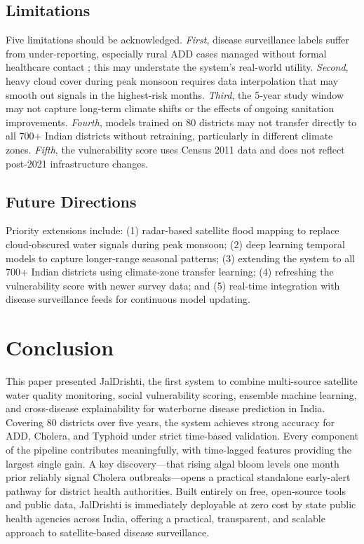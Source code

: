 \documentclass[conference]{IEEEtran}
\begin{document}
\subsection{Limitations}

Five limitations should be acknowledged. \emph{First}, disease
surveillance labels suffer from under-reporting, especially rural ADD
cases managed without formal healthcare contact \cite{idsp2025}; this
may understate the system's real-world utility. \emph{Second}, heavy
cloud cover during peak monsoon requires data interpolation that may
smooth out signals in the highest-risk months. \emph{Third}, the
5-year study window may not capture long-term climate shifts or the
effects of ongoing sanitation improvements. \emph{Fourth}, models
trained on 80 districts may not transfer directly to all 700+ Indian
districts without retraining, particularly in different climate zones.
\emph{Fifth}, the vulnerability score uses Census 2011 data and does
not reflect post-2021 infrastructure changes.

\subsection{Future Directions}

Priority extensions include: (1) radar-based satellite flood mapping to
replace cloud-obscured water signals during peak monsoon; (2) deep
learning temporal models to capture longer-range seasonal patterns;
(3) extending the system to all 700+ Indian districts using climate-zone
transfer learning; (4) refreshing the vulnerability score with newer
survey data; and (5) real-time integration with disease surveillance
feeds for continuous model updating.

\section{Conclusion}

This paper presented JalDrishti, the first system to combine
multi-source satellite water quality monitoring, social vulnerability
scoring, ensemble machine learning, and cross-disease explainability
for waterborne disease prediction in India. Covering 80 districts over
five years, the system achieves strong accuracy for ADD, Cholera, and
Typhoid under strict time-based validation. Every component of the
pipeline contributes meaningfully, with time-lagged features providing
the largest single gain. A key discovery---that rising algal bloom
levels one month prior reliably signal Cholera outbreaks---opens a
practical standalone early-alert pathway for district health authorities.
Built entirely on free, open-source tools and public data, JalDrishti
is immediately deployable at zero cost by state public health agencies
across India, offering a practical, transparent, and scalable approach
to satellite-based disease surveillance.
\end{document}
